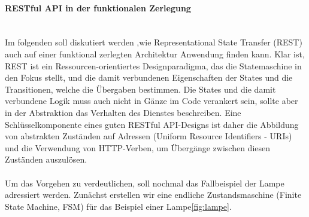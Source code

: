 \paragraph{RESTful API in der funktionalen Zerlegung\\\\}
Im folgenden soll diskutiert werden ,wie Representational State Transfer (REST) auch auf einer funktional zerlegten Architektur Anwendung finden kann.  Klar ist, REST ist ein Ressourcen-orientiertes Designparadigma, das die Statemaschine in den Fokus stellt, und die damit verbundenen Eigenschaften der States und die Transitionen, welche die Übergaben bestimmen. Die States und die damit verbundene Logik muss auch nicht in Gänze im Code verankert sein, sollte aber in der Abstraktion das Verhalten des Dienstes beschreiben. Eine Schlüsselkomponente eines guten RESTful API-Designs ist daher die Abbildung von abstrakten Zuständen auf Adressen (Uniform Resource Identifiers - URIs) und die Verwendung von HTTP-Verben, um Übergänge zwischen diesen Zuständen auszulösen. 
\\\\
Um das Vorgehen zu verdeutlichen, soll nochmal das Fallbeispiel der Lampe adressiert werden. Zunächst erstellen wir eine endliche Zustandsmaschine (Finite State Machine, FSM) für das Beispiel einer Lampe\ref{fig:lampe}.

